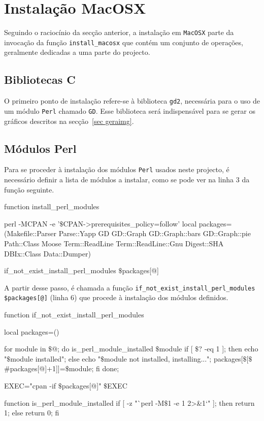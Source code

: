 \section{Instalação MacOSX}
Seguindo o raciocínio da secção anterior, a instalação em \texttt{MacOSX} parte da invocação da função \texttt{install\_macosx} que contém um conjunto de operações, geralmente dedicadas 
a uma parte do projecto. 

\subsection{Bibliotecas C}
O primeiro ponto de instalação refere-se à biblioteca \texttt{gd2}, necessária para o uso de um módulo \texttt{Perl} chamado \texttt{GD}. Esse biblioteca será indispensável para se 
gerar os gráficos descritos na secção~\ref{sec geraimg}.

\subsection{Módulos Perl}\label{subsec modulosperlmacosx}
Para se proceder à instalação dos módulos \texttt{Perl} usados neste projecto, é necessário definir a lista de módulos a instalar, como se pode ver na linha 3 da função seguinte.

\begin{myxml}
 function install_perl_modules {
        perl -MCPAN -e '$\$$CPAN->{prerequisites_policy}=follow'
        local packages=(Makefile::Parser Parse::Yapp  GD GD::Graph GD::Graph::bars GD::Graph::pie Path::Class
                  Moose Term::ReadLine Term::ReadLine::Gnu Digest::SHA DBIx::Class Data::Dumper)

        if_not_exist_install_perl_modules $\$${packages[@]}
}
\end{myxml}
 
A partir desse passo, é chamada a função \texttt{if\_not\_exist\_install\_perl\_modules \${packages[@]}} (linha 6) que procede à instalação dos módulos definidos.

\begin{myxml}
 function if_not_exist_install_perl_modules {
        local packages=()

        for module in $\$$@; do
                is_perl_module_installed $\$$module
                if [ $\$$? -eq 1 ]; then
                        echo "$\$$module installed";
                else
                        echo "$\$$module not installed, installing...";
                        packages[$\$$[$\$${#packages[@]}+1]]=$\$$module;
                fi
        done;

        EXEC="cpan -if $\$${packages[@]}"
        $\$$EXEC
}

function is_perl_module_installed {
        if [ -z "`perl -M$\$$1 -e 1 2>&1`" ]; then
                return 1;
        else
                return 0;
        fi
}
\end{myxml}

